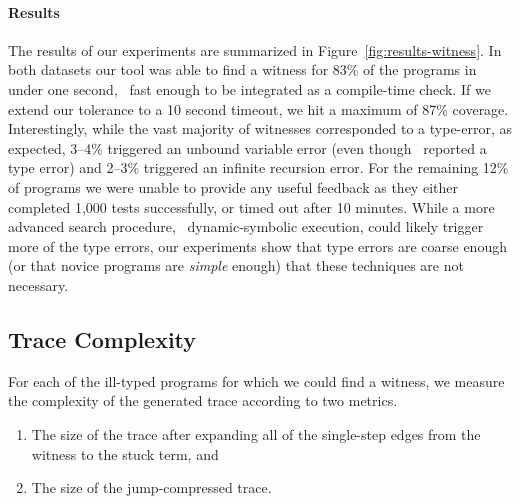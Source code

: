 \paragraph{Results}
\label{sec:results-witness}
The results of our experiments are summarized in
Figure~\ref{fig:results-witness}.
%
In both datasets our tool was able to find a witness for 83\% of the
programs in under one second, \ie\ fast enough to be integrated as a
compile-time check. If we extend our tolerance to a 10 second timeout,
we hit a maximum of 87\% coverage.
%
Interestingly, while the vast majority of witnesses corresponded to a
type-error, as expected, 3--4\% triggered an unbound variable error (even
though \ocaml\ reported a type error) and 2--3\% triggered an infinite
recursion error.
%
For the remaining 12\% of programs we were unable to provide any useful
feedback as they either completed 1,000 tests successfully, or timed out
after 10 minutes.
%
%
While a more advanced search procedure, \eg\ dynamic-symbolic execution,
could likely trigger more of the type errors, our experiments show that
type errors are coarse enough (or that novice programs are \emph{simple}
enough) that these techniques are not necessary.


\subsection{Trace Complexity}
\label{sec:trace-complexity}

For each of the ill-typed programs for which we could
find a witness, we measure the complexity of the generated
trace according to two metrics.

%
\begin{enumerate}
\item {} The size of the trace after expanding
  all of the single-step edges from the witness to the stuck term, and
\item {} The size of the jump-compressed trace.
\end{enumerate}



